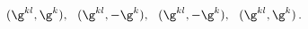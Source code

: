\begin{equation} \label{cacD} 
(\g^{kl}, \g^k), ~~(\g^{kl}, -\g^k), ~~(\g^{kl}, -\g^k), ~~ (\g^{kl}, \g^k)\,.
 \end{equation} 
